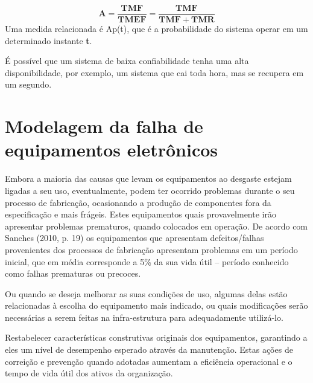 \begin{equation}
\label{eqn02}
	\mathbf{A} = \mathbf{\frac{TMF}{TMEF}} = \mathbf{\frac{TMF}{TMF + TMR}}
\end{equation}
Uma medida relacionada é Ap(t), que é a probabilidade do sistema operar em um determinado instante \textbf{t}.

É possível que um sistema de baixa confiabilidade tenha uma alta disponibilidade, por exemplo, um sistema que cai toda hora, mas se recupera em um segundo.


\section{Modelagem da falha de equipamentos eletrônicos}

Embora a maioria das causas que levam os equipamentos ao desgaste estejam ligadas a seu uso, eventualmente, podem ter ocorrido problemas durante o seu processo de fabricação, ocasionando a produção de componentes fora da especificação e mais frágeis. Estes equipamentos quais provavelmente irão apresentar problemas prematuros, quando colocados em operação. De acordo com Sanches (2010, p. 19) os equipamentos que apresentam defeitos/falhas provenientes dos processos de fabricação apresentam problemas em um período inicial, que em média corresponde a 5\% da sua vida útil – período conhecido como falhas prematuras ou precoces.

Ou quando se deseja melhorar as suas condições de uso, algumas delas estão relacionadas à escolha do equipamento mais indicado, ou quais modificações serão necessárias a serem feitas na infra-estrutura para adequadamente utilizá-lo.

Restabelecer características construtivas originais dos equipamentos, garantindo a eles um nível de desempenho esperado através da manutenção. 
Estas ações de correição e prevenção quando adotadas aumentam a eficiência operacional e o tempo de vida útil dos ativos da organização.

